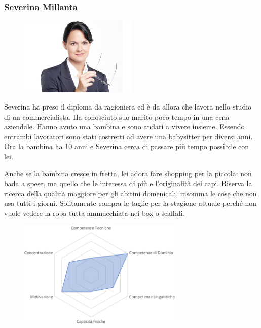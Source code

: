 \documentclass[12pt,italian,]{report}
\begin{document}
\hypertarget{severina-millanta-1}{%
\subsubsection{Severina Millanta}\label{severina-millanta-1}}

\begin{figure}[h]
\centering
\includegraphics[width=0.5\textwidth,height=\textheight]{img/severina.jpg}
\end{figure}

Severina ha preso il diploma da ragioniera ed è da allora che lavora
nello studio di un commercialista. Ha conosciuto suo marito poco tempo
in una cena aziendale. Hanno avuto una bambina e sono andati a vivere
insieme. Essendo entrambi lavoratori sono stati costretti ad avere una
babysitter per diversi anni. Ora la bambina ha 10 anni e Severina cerca
di passare più tempo possibile con lei.

Anche se la bambina cresce in fretta, lei adora fare shopping per la
piccola: non bada a spese, ma quello che le interessa di più e
l'originalità dei capi. Riserva la ricerca della qualità maggiore per
gli abitini domenicali, insomma le cose che non usa tutti i giorni.
Solitamente compra le taglie per la stagione attuale perché non vuole
vedere la roba tutta ammucchiata nei box o scaffali.

\begin{figure}[h]
\centering
\includegraphics[width=0.7\textwidth,height=\textheight]{img/severina_competenze.png}
\end{figure}
\end{document}
